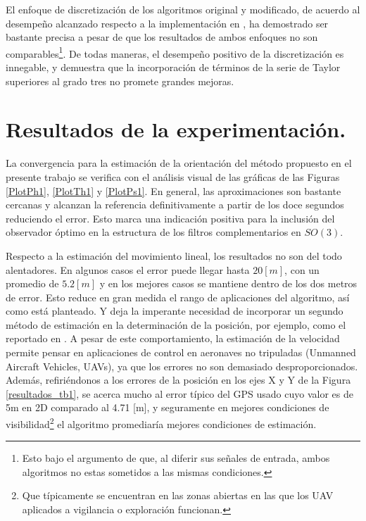 \documentclass[conference]{IEEEtran}
\begin{document}
El enfoque de discretización de los algoritmos original y modificado, de acuerdo al desempeño alcanzado respecto a la implementación en \cite{Mahony2008}, ha demostrado ser bastante precisa a pesar de que los resultados de ambos enfoques no son comparables\footnote{Esto bajo el argumento de que, al diferir sus señales de entrada, ambos algoritmos no estas sometidos a las mismas condiciones.}.
De todas maneras, el desempeño positivo de la discretización es innegable, y demuestra que la incorporación de términos de la serie de Taylor superiores al grado tres no promete grandes mejoras.\par
\section{Resultados de la experimentación.} %
La convergencia para la estimación de la orientación del método propuesto en el presente trabajo se verifica con el análisis visual de las gráficas de las Figuras \ref{PlotPh1}, \ref{PlotTh1} y \ref{PlotPs1}. En general, las aproximaciones son bastante cercanas y alcanzan la referencia definitivamente a partir de los doce segundos reduciendo el error. Esto marca una indicación positiva para la inclusión del observador óptimo en la estructura de los filtros complementarios en $SO(3)$.\par
Respecto a la estimación del movimiento lineal, los resultados no son del todo alentadores. En algunos casos el error puede llegar hasta $20[m]$, con un promedio de $5.2[m]$ y en los mejores casos se mantiene dentro de los dos metros de error. Esto reduce en gran medida el rango de aplicaciones del algoritmo, así como está planteado. Y deja la imperante necesidad de incorporar un segundo método de estimación en la determinación de la posición, por ejemplo, como el reportado en \cite{Merwe2004}. A pesar de este comportamiento, la estimación de la velocidad permite pensar en aplicaciones de control en aeronaves no tripuladas (Unmanned Aircraft Vehicles, UAVs), ya que los errores no son demasiado desproporcionados. Además, refiriéndonos a los errores de la posición en los ejes X y Y de la Figura \ref{resultados_tb1}, se acerca mucho al error típico del GPS usado \cite{Mediatek2009} cuyo valor es de 5m en 2D comparado al 4.71 [m], y seguramente en mejores condiciones de visibilidad\footnote{Que típicamente se encuentran en las zonas abiertas en las que los UAV aplicados a vigilancia o exploración funcionan.} el algoritmo promediaría mejores condiciones de estimación.\par
\end{document}
